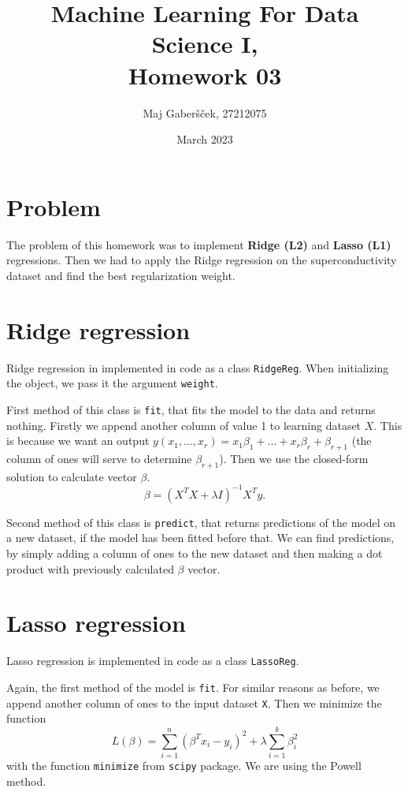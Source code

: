 \documentclass{article}
\title{Machine Learning For Data Science I, \\[0.1cm] Homework 03}
\author{Maj Gaberšček, 27212075}
\date{March 2023}
\begin{document}
\maketitle

\section{Problem}

The problem of this homework was to implement \textbf{Ridge (L2)} and \textbf{Lasso (L1)} regressions. Then we had to apply the Ridge regression on the superconductivity dataset and find the best regularization weight. 

\section{Ridge regression}

Ridge regression in implemented in code as a class \texttt{RidgeReg}. When initializing the object, we pass it the argument \texttt{weight}.

First method of this class is \texttt{fit}, that fits the model to the data and returns nothing. Firstly we append another column of value 1 to learning dataset $X$. This is because we want an output $y(x_1, ..., x_r) = x_1 \beta_{1} + ... + x_r \beta_{r} + \beta_{r+1}$ (the column of ones will serve to determine $\beta_{r+1}$). Then we use the closed-form solution to calculate vector $\beta$.
$$\beta=(X^T X+ \lambda I)^{-1} X^T y.$$

Second method of this class is \texttt{predict}, that returns predictions of the model on a new dataset, if the model has been fitted before that. We can find predictions, by simply adding a column of ones to the new dataset and then making a dot product with previously calculated $\beta$ vector. 

\section{Lasso regression}

Lasso regression is implemented in code as a class \texttt{LassoReg}.

Again, the first method of the model is \texttt{fit}. For similar reasons as before, we append another column of ones to the input dataset \texttt{X}. Then we minimize the function 
$$L(\beta)= \sum_{i=1}^{n}{(\beta^T x_i - y_i)^2} + \lambda \sum_{i=1}^{k}{\beta_i^2}$$
with the function \texttt{minimize} from \texttt{scipy} package. We are using the Powell method. 
\end{document}
